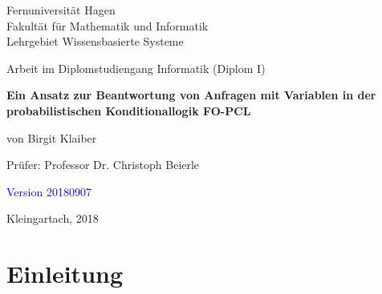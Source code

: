 \documentclass[draft]{scrreprt}
\begin{document}
\begin{titlepage}
\thispagestyle{empty}
\begin{center}
\Large{Fernuniversität Hagen}\\
\Large{Fakultät für Mathematik und Informatik}\\
\Large{Lehrgebiet Wissensbasierte Systeme}\\[1.5cm]
\end{center}


\begin{center}
{Arbeit im Diplomstudiengang Informatik (Diplom I)}\\[2.0cm]
\end{center}

\begin{center}


\LARGE \textbf{Ein Ansatz zur Beantwortung von Anfragen mit Variablen in der probabilistischen Konditionallogik FO-PCL}\\[3.5cm]
\end{center}


\begin{center}
\large{von Birgit Klaiber}\\[3.5cm]
\end{center}

\begin{center}
\large{Prüfer: Professor Dr. Christoph Beierle }\\[1.0cm]
\end{center}

\begin{center}
\textcolor{blue}{Version 20180907}
	
\large{Kleingartach, 2018}
\end{center}

\end{titlepage}






\begingroup



\setcounter{tocdepth}{1}

\tableofcontents
\clearpage
\endgroup
{}
\pagestyle{plain}
\setcounter{page}{1}
\pagestyle{headings}


\setlength{\parskip}{5pt}




\chapter{Einleitung}
\end{document}

